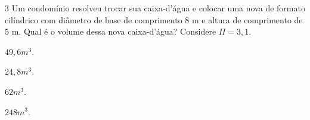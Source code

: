 














\num{3} Um condomínio resolveu trocar sua caixa-d'água e colocar uma nova de
formato cilíndrico com diâmetro de base de comprimento 8 m e altura de
comprimento de 5 m. Qual é o volume dessa nova caixa-d'água? Considere $\Pi = 3,1$.

\begin{escolha}[itemsep=0pt]
\item $49,6 m^3$.
\item $24,8 m^3$.
\item $62 m^3$.
\item $248 m^3$.
\end{escolha}




